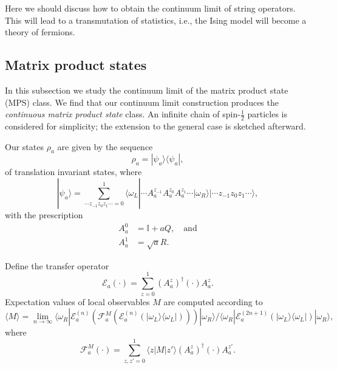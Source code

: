 \documentclass[prl,twocolumn,lengthcheck,superscriptaddress]{revtex4-1}
\theoremstyle{definition}
\theoremstyle{remark}
\begin{document}
Here we should discuss how to obtain the continuum limit of string operators. This will lead to a transmutation of statistics, i.e., the Ising model will become a theory of fermions.

\subsection{Matrix product states}
In this subsection we study the continuum limit of the matrix product state (MPS) class. We find that our continuum limit construction produces the \emph{continuous matrix product state} class. An infinite chain of spin-$\frac12$ particles is considered for simplicity; the extension to the general case is sketched afterward. 

Our states $\rho_a$ are given by the sequence
\begin{equation}
	\rho_a = |\psi_a\rangle\langle \psi_a|,
\end{equation}
of translation invariant states, where
\begin{equation}
	|\psi_a\rangle = \sum_{\cdots z_{-1}z_0z_{1} \cdots = 0}^{1}\langle \omega_L| \cdots A^{z_{-1}}_aA^{z_{0}}_a A^{z_{1}}_a\cdots |\omega_R\rangle |\cdots z_{-1}z_0z_{1} \cdots \rangle,
\end{equation}
with the prescription
\begin{equation}
	\begin{split}
		A^0_a &= \mathbb{I} + a Q, \quad \text{and} \\
		A^1_a &= \sqrt{a} R.
	\end{split}
\end{equation}

Define the transfer operator
\begin{equation}
	\mathcal{E}_a(\cdot) = \sum_{z=0}^1 (A^z_a)^\dag (\cdot) A^z_a.
\end{equation}
Expectation values of local observables $M$ are computed according to
\begin{equation}
	\langle M \rangle = \lim_{n\rightarrow \infty}\langle \omega_R| \mathcal{E}^{(n)}_a(\mathcal{F}_a^{M}(\mathcal{E}^{(n)}_a(|\omega_L\rangle \langle \omega_L|)))|\omega_R\rangle / \langle \omega_R| \mathcal{E}^{(2n+1)}_a(|\omega_L\rangle \langle \omega_L|)|\omega_R\rangle,
\end{equation}
where
\begin{equation}
	\mathcal{F}_a^{M}(\cdot) = \sum_{z,z'=0}^1 \langle z|M|z'\rangle  (A^z_a)^\dag (\cdot) A^{z'}_a.
\end{equation}
\end{document}

